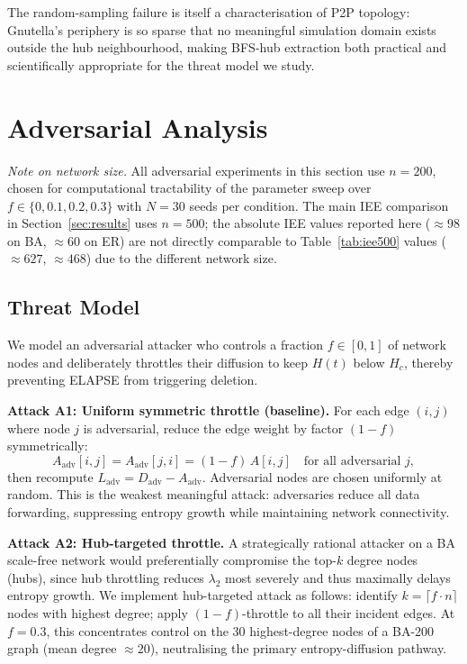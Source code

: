 \documentclass[review,12pt]{elsarticle}
\newcommand{\Hc}{H_c}
\begin{document}
The random-sampling failure is itself a characterisation of P2P topology:
Gnutella's periphery is so sparse that no meaningful simulation domain exists
outside the hub neighbourhood, making BFS-hub extraction both practical and
scientifically appropriate for the threat model we study.

\section{Adversarial Analysis}
\label{sec:adversarial}

\emph{Note on network size.}  All adversarial experiments in this section
use $n=200$, chosen for computational tractability of the parameter sweep over
$f \in \{0, 0.1, 0.2, 0.3\}$ with $N=30$ seeds per condition.
The main IEE comparison in Section~\ref{sec:results} uses $n=500$; the
absolute IEE values reported here (${\approx}98$ on BA, ${\approx}60$ on ER)
are not directly comparable to Table~\ref{tab:iee500} values (${\approx}627$,
${\approx}468$) due to the different network size.

\subsection{Threat Model}

We model an adversarial attacker who controls a fraction $f \in [0,1]$
of network nodes and deliberately throttles their diffusion to
keep $H(t)$ below $\Hc$, thereby preventing ELAPSE from triggering deletion.

\textbf{Attack A1: Uniform symmetric throttle (baseline).}
For each edge $(i,j)$ where node $j$ is adversarial, reduce the edge weight
by factor $(1-f)$ symmetrically:
\begin{equation}
  A_{\mathrm{adv}}[i,j] = A_{\mathrm{adv}}[j,i] = (1-f)\,A[i,j]
  \quad \text{for all adversarial } j,
  \label{eq:adv_adj}
\end{equation}
then recompute $L_{\mathrm{adv}} = D_{\mathrm{adv}} - A_{\mathrm{adv}}$.
Adversarial nodes are chosen uniformly at random. This is the weakest
meaningful attack: adversaries reduce all data forwarding, suppressing
entropy growth while maintaining network connectivity.

\textbf{Attack A2: Hub-targeted throttle.}
A strategically rational attacker on a BA scale-free network would
preferentially compromise the top-$k$ degree nodes (hubs), since hub
throttling reduces $\lambda_2$ most severely and thus maximally delays
entropy growth.  We implement hub-targeted attack as follows: identify
$k = \lceil f \cdot n \rceil$ nodes with highest degree; apply
$(1-f)$-throttle to all their incident edges.  At $f=0.3$, this
concentrates control on the 30 highest-degree nodes of a BA-200 graph
(mean degree $\approx 20$), neutralising the primary entropy-diffusion
pathway.
\end{document}
